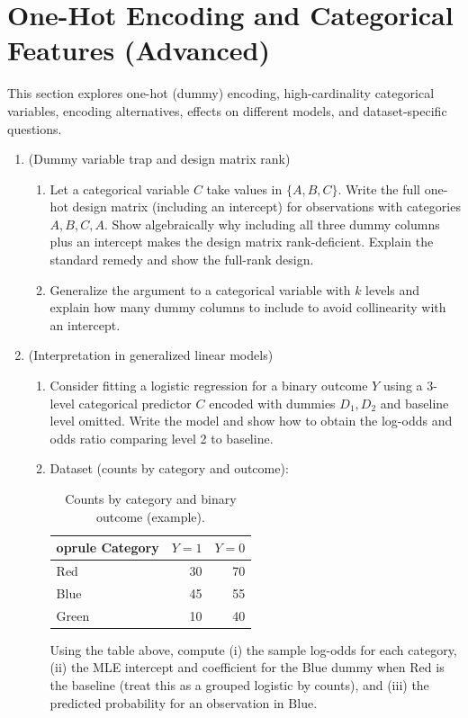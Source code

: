\documentclass[12pt,a4paper]{article}
\begin{document}
\section{One-Hot Encoding and Categorical Features (Advanced)}
This section explores one-hot (dummy) encoding, high-cardinality categorical variables, encoding alternatives, effects on different models, and dataset-specific questions.
\begin{enumerate}[label=(\arabic*)]
\item (Dummy variable trap and design matrix rank)
    \begin{enumerate}[label=(\alph*)]
    \item Let a categorical variable \(C\) take values in \(\{A,B,C\}\). Write the full one-hot design matrix (including an intercept) for observations with categories \(A,B,C,A\). Show algebraically why including all three dummy columns plus an intercept makes the design matrix rank-deficient. Explain the standard remedy and show the full-rank design.
    \item Generalize the argument to a categorical variable with \(k\) levels and explain how many dummy columns to include to avoid collinearity with an intercept.
    \end{enumerate}

\item (Interpretation in generalized linear models)
    \begin{enumerate}[label=(\alph*)]
    \item Consider fitting a logistic regression for a binary outcome \(Y\) using a 3-level categorical predictor \(C\) encoded with dummies \(D_1,D_2\) and baseline level omitted. Write the model and show how to obtain the log-odds and odds ratio comparing level 2 to baseline.
    \item Dataset (counts by category and outcome):
    \begin{table}[H]
    \centering
    \begin{tabular}{lrr}
    	oprule
    Category & $Y=1$ & $Y=0$ \\
    \midrule
    Red & 30 & 70 \\
    Blue & 45 & 55 \\
    Green & 10 & 40 \\
    \bottomrule
    \end{tabular}
    \caption{Counts by category and binary outcome (example).}
    \end{table}
    Using the table above, compute (i) the sample log-odds for each category, (ii) the MLE intercept and coefficient for the \(\text{Blue}\) dummy when \(\text{Red}\) is the baseline (treat this as a grouped logistic by counts), and (iii) the predicted probability for an observation in \(\text{Blue}\).
    \end{enumerate}


\end{enumerate}
\end{document}

